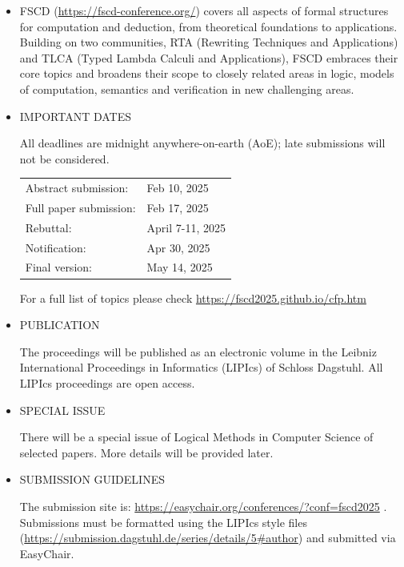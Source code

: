 \documentclass[prodmode,acmtecs]{acmsmall} %
\begin{document}
\begin{itemize}\item  FSCD (\href{https://fscd-conference.org/}{https://fscd-conference.org/}) covers all aspects of formal structures for computation and deduction, from theoretical foundations to applications. Building on two communities, RTA (Rewriting Techniques and Applications) and TLCA (Typed Lambda Calculi and Applications), FSCD embraces their core topics and broadens their scope to closely related areas in logic, models of computation, semantics and verification in new challenging areas.                    
 
\item  IMPORTANT DATES 
 
  All deadlines are midnight anywhere-on-earth (AoE); late submissions will not be considered. 
 
\begin{tabulary}{\linewidth}{LL}Abstract submission:  & Feb 10, 2025 \\
Full paper submission:  & Feb 17, 2025 \\
Rebuttal:  & April 7-11, 2025 \\
Notification:  & Apr 30, 2025 \\
Final version:  & May 14, 2025 \\
\end{tabulary}
 
  For a full list of topics please check \href{https://fscd2025.github.io/cfp.htm}{https://fscd2025.github.io/cfp.htm} 
 
\item  PUBLICATION 
 
  The proceedings will be published as an electronic volume in the Leibniz International Proceedings in Informatics (LIPIcs) of Schloss Dagstuhl. All LIPIcs proceedings are open access. 
 
\item  SPECIAL ISSUE 
 
  There will be a special issue of Logical Methods in Computer Science of selected papers. More details will be provided later. 
 
\item  SUBMISSION GUIDELINES 
 
  The submission site is: \href{https://easychair.org/conferences/?conf=fscd2025}{https://easychair.org/conferences/?conf=fscd2025} . Submissions must be formatted using the LIPIcs style files (\href{https://submission.dagstuhl.de/series/details/5#author}{https://submission.dagstuhl.de/series/details/5\#author}) and submitted via EasyChair. 
 

\end{itemize}
\end{document}
